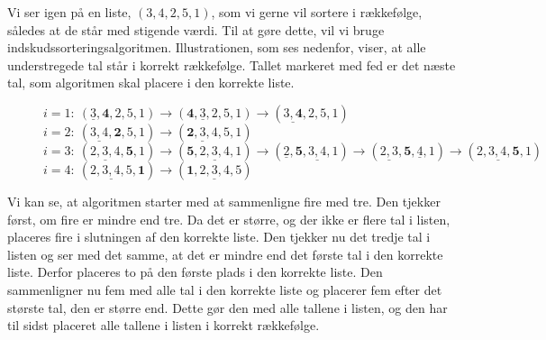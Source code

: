 \begin{exmp}
Vi ser igen på en liste, $(3,4,2,5,1)$, som vi gerne vil sortere i rækkefølge, således at de står med stigende værdi. Til at gøre dette, vil vi bruge indskudssorteringsalgoritmen. Illustrationen, som ses nedenfor, viser, at alle understregede tal står i korrekt rækkefølge. Tallet markeret med fed er det næste tal, som algoritmen skal placere i den korrekte liste.

\begin{figure}[H]
\label{fig:indskud}
	\begin{flushleft}
	$i=1: \ (\underline{3},\textbf{4},2,5,1) \rightarrow (\textbf{4}, \underline{3},2,5,1)\rightarrow (\underline{3,\textbf{4}},2,5,1)$ \\
	$i=2: \ (\underline{3,4},\textbf{2},5,1) \rightarrow (\underline{\textbf{2},3,4},5,1) $\\
	$i=3: \ (\underline{2,3,4},\textbf{5},1) \rightarrow (\textbf{5},\underline{2,3,4},1) \rightarrow (\underline{2}, \textbf{5},\underline{3,4},1) \rightarrow (\underline{2,3}, \textbf{5}, \underline{4},1) \rightarrow (\underline{2,3,4,\textbf{5}},1) $ \\
	$i=4: \ (\underline{2,3,4,5},\textbf{1}) \rightarrow (\underline{\textbf{1},2,3,4,5}) $\\
 	\end{flushleft}
\end{figure}

Vi kan se, at algoritmen starter med at sammenligne fire med tre. Den tjekker først, om fire er mindre end tre. Da det er større, og der ikke er flere tal i listen, placeres fire i slutningen af den korrekte liste. Den tjekker nu det tredje tal i listen og ser med det samme, at det er mindre end det første tal i den korrekte liste. Derfor placeres to på den første plads i den korrekte liste. Den sammenligner nu fem med alle tal i den korrekte liste og placerer fem efter det største tal, den er større end. Dette gør den med alle tallene i listen, og den har til sidst placeret alle tallene i listen i korrekt rækkefølge.


\end{exmp}